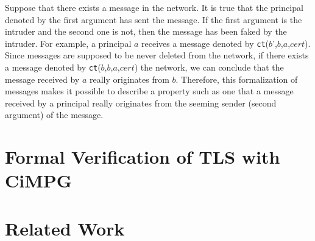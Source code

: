 \documentclass[a4paper,fleqn]{cas-dc}
\begin{document}
Suppose that there exists a message in the network. It is true that the principal denoted by the first
argument has sent the message. If the first argument is the
intruder and the second one is not, then the message has been
faked by the intruder. For example, a principal $a$ receives a message denoted by \verb!ct!($b$',$b$,$a$,$cert$). 
Since messages are supposed to be never deleted from the network, if there exists a message denoted by
\verb!ct!($b$,$b$,$a$,$cert$) the network, we can conclude that the message received by $a$ really originates from $b$.
Therefore, this formalization of messages makes it possible to describe a property such as one that a message received by a principal really originates from the seeming sender (second argument) of the message. 



\section{Formal Verification of TLS with CiMPG}\label{fvtls}



\section{Related Work}\label{relatedwork}

\end{document}
